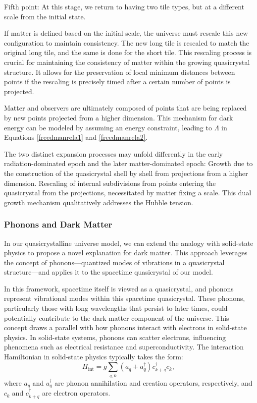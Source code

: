 \documentclass{article}
\begin{document}
Fifth point: At this stage, we return to having two tile types, but at a different scale from the initial state.

If matter is defined based on the initial scale, the universe must rescale this new configuration to maintain consistency. The new long tile is rescaled to match the original long tile, and the same is done for the short tile.
This rescaling process is crucial for maintaining the consistency of matter within the growing quasicrystal structure. It allows for the preservation of local minimum distances between points if the rescaling is precisely timed after a certain number of points is projected.


Matter and observers are ultimately composed of points that are being replaced by new points projected from a higher dimension. This mechanism for dark energy can be modeled by assuming an energy constraint, leading to $\Lambda$ in Equations \ref{freedmanrela1} and \ref{freedmanrela2}.

The two distinct expansion processes may unfold differently in the early radiation-dominated epoch and the later matter-dominated epoch:
Growth due to the construction of the quasicrystal shell by shell from projections from a higher dimension.
Rescaling of internal subdivisions from points entering the quasicrystal from the projections, necessitated by matter fixing a scale.
This dual growth mechanism qualitatively addresses the Hubble tension.

\subsubsection{Phonons and Dark Matter}
In our quasicrystalline universe model, we can extend the analogy with solid-state physics to propose a novel explanation for dark matter. This approach leverages the concept of phonons—quantized modes of vibrations in a quasicrystal structure—and applies it to the spacetime quasicrystal of our model.

In this framework, spacetime itself is viewed as a quasicrystal, and phonons represent vibrational modes within this spacetime quasicrystal. These phonons, particularly those with long wavelengths that persist to later times, could potentially contribute to the dark matter component of the universe.
This concept draws a parallel with how phonons interact with electrons in solid-state physics. In solid-state systems, phonons can scatter electrons, influencing phenomena such as electrical resistance and superconductivity. The interaction Hamiltonian in solid-state physics typically takes the form:
\begin{equation}
H_{\text{int}} = g \sum_{q,k} (a_q + a_q^{\dagger}) c_{k+q}^{\dagger} c_k,
\end{equation}
where $a_q$ and $a_q^{\dagger}$ are phonon annihilation and creation operators, respectively, and $c_k$ and $c_{k+q}^{\dagger}$ are electron operators.
\end{document}
